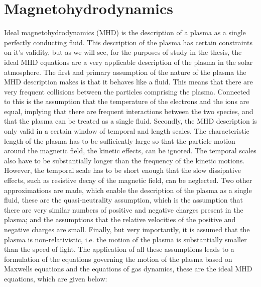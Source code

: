 \section{Magnetohydrodynamics}\label{sec:MHD}

Ideal magnetohydrodynamics (MHD) is the description of a plasma as a single perfectly conducting fluid.
This description of the plasma has certain constraints on it's validity, but as we will see, for the purposes of study in the thesis, the ideal MHD equations are a very applicable description of the plasma in the solar atmosphere.
The first and primary assumption of the nature of the plasma the MHD description makes is that it behaves like a fluid.
This means that there are very frequent collisions between the particles comprising the plasma.
Connected to this is the assumption that the temperature of the electrons and the ions are equal, implying that there are frequent interactions between the two species, and that the plasma can be treated as a single fluid.
Secondly, the MHD description is only valid in a certain window of temporal and length scales.
The characteristic length of the plasma has to be sufficiently large so that the particle motion around the magnetic field, the kinetic effects, can be ignored.
The temporal scales also have to be substantially longer than the frequency of the kinetic motions.
However, the temporal scale has to be short enough that the slow dissipative effects, such as resistive decay of the magnetic field, can be neglected.
Two other approximations are made, which enable the description of the plasma as a single fluid, these are the quasi-neutrality assumption, which is the assumption that there are very similar numbers of positive and negative charges present in the plasma; and the assumptions that the relative velocities of the positive and negative charges are small.
Finally, but very importantly, it is assumed that the plasma is non-relativistic, i.e. the motion of the plasma is substantially smaller than the speed of light.
The application of all these assumptions leads to a formulation of the equations governing the motion of the plasma based on Maxwells equations and the equations of gas dynamics, these are the ideal MHD equations, which are given below:
\newcommand{\condev}{\left(\frac{\partial}{\partial t} + \vec{v}\cdot\nabla\right)}

